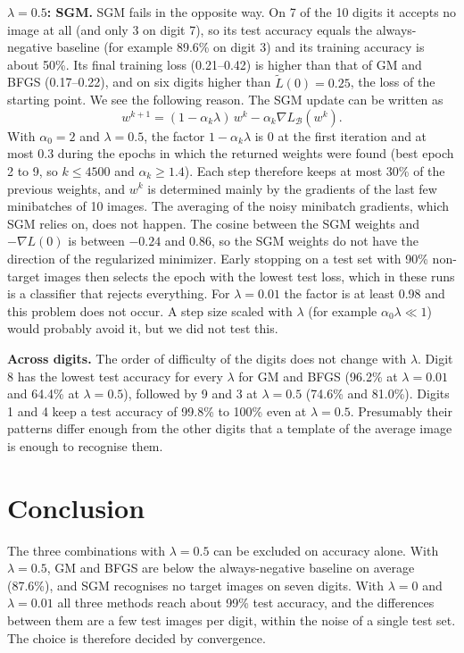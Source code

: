\textbf{$\lambda=0.5$: SGM.} SGM fails in the opposite way. On 7 of the 10 digits it accepts no image at all (and only 3 on digit 7), so its test accuracy equals the always-negative baseline (for example 89.6\% on digit 3) and its training accuracy is about 50\%. Its final training loss (0.21--0.42) is higher than that of GM and BFGS (0.17--0.22), and on six digits higher than $\tilde L(0)=0.25$, the loss of the starting point. We see the following reason. The SGM update can be written as
\[
  w^{k+1}=(1-\alpha_k\lambda)\,w^k-\alpha_k\nabla L_{\mathcal B}(w^k).
\]
With $\alpha_0=2$ and $\lambda=0.5$, the factor $1-\alpha_k\lambda$ is 0 at the first iteration and at most 0.3 during the epochs in which the returned weights were found (best epoch 2 to 9, so $k\le4500$ and $\alpha_k\ge1.4$). Each step therefore keeps at most 30\% of the previous weights, and $w^k$ is determined mainly by the gradients of the last few minibatches of 10 images. The averaging of the noisy minibatch gradients, which SGM relies on, does not happen. The cosine between the SGM weights and $-\nabla L(0)$ is between $-0.24$ and $0.86$, so the SGM weights do not have the direction of the regularized minimizer. Early stopping on a test set with 90\% non-target images then selects the epoch with the lowest test loss, which in these runs is a classifier that rejects everything. For $\lambda=0.01$ the factor is at least 0.98 and this problem does not occur. A step size scaled with $\lambda$ (for example $\alpha_0\lambda\ll1$) would probably avoid it, but we did not test this.

\textbf{Across digits.} The order of difficulty of the digits does not change with $\lambda$. Digit 8 has the lowest test accuracy for every $\lambda$ for GM and BFGS (96.2\% at $\lambda=0.01$ and 64.4\% at $\lambda=0.5$), followed by 9 and 3 at $\lambda=0.5$ (74.6\% and 81.0\%). Digits 1 and 4 keep a test accuracy of 99.8\% to 100\% even at $\lambda=0.5$. Presumably their patterns differ enough from the other digits that a template of the average image is enough to recognise them.

\section{Conclusion}\label{sec:conclusion}

The three combinations with $\lambda=0.5$ can be excluded on accuracy alone. With $\lambda=0.5$, GM and BFGS are below the always-negative baseline on average (87.6\%), and SGM recognises no target images on seven digits. With $\lambda=0$ and $\lambda=0.01$ all three methods reach about 99\% test accuracy, and the differences between them are a few test images per digit, within the noise of a single test set. The choice is therefore decided by convergence.

